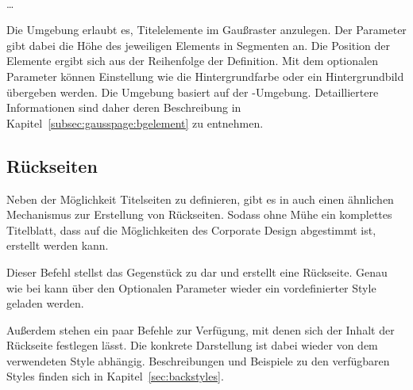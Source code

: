 \begin{Declaration}
    \\
  \quad\dots\\
\end{Declaration}

Die Umgebung  erlaubt es, Titelelemente im 
Gaußraster anzulegen. Der Parameter  gibt dabei
die Höhe des jeweiligen Elements in Segmenten an. Die Position der Elemente
ergibt sich aus der Reihenfolge der Definition.
Mit dem optionalen Parameter  können Einstellung wie
die Hintergrundfarbe oder ein Hintergrundbild übergeben werden.
Die Umgebung basiert auf der -Umgebung.
Detailliertere Informationen sind daher deren Beschreibung
in Kapitel~\ref{subsec:gausspage:bgelement} zu entnehmen.

\subsection{Rückseiten}\label{subsec:backpages}

Neben der Möglichkeit Titelseiten zu definieren, gibt es in \tubslatex auch
einen ähnlichen Mechanismus zur Erstellung von Rückseiten.
Sodass ohne Mühe ein komplettes Titelblatt, dass auf die Möglichkeiten des
Corporate Design abgestimmt ist, erstellt werden kann.

\begin{Declaration}
\end{Declaration}

Dieser Befehl stellst das Gegenstück zu  dar und erstellt eine
Rückseite. Genau wie bei  kann über den Optionalen Parameter
 wieder ein vordefinierter Style geladen werden.

Außerdem stehen ein paar Befehle zur Verfügung, mit denen sich der Inhalt
der Rückseite festlegen lässt. Die konkrete Darstellung ist dabei wieder
von dem verwendeten Style abhängig.
Beschreibungen und Beispiele zu den verfügbaren Styles finden sich in
Kapitel~\ref{sec:backstyles}.


\begin{Declaration}
  \\
\end{Declaration}

